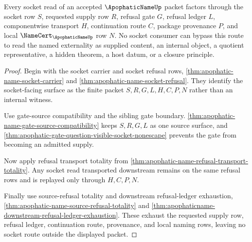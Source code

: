 \begin{theorem}
\label{thm:apophatic-name-socket-gate-route-exhaustion}
Every socket read of an accepted $\ApophaticNameUp$ packet factors through the socket row $S$, requested supply row $R$, refusal gate $G$, refusal ledger $L$, componentwise transport $H$, continuation route $C$, package provenance $P$, and local $\NameCert_{\ApophaticNameUp}$ row $N$. No socket consumer can bypass this route to read the named externality as supplied content, an internal object, a quotient representative, a hidden theorem, a host datum, or a closure principle.
\end{theorem}
\begin{proof}
Begin with the socket carrier and socket refusal rows, \autoref{thm:apophatic-name-socket-carrier} and \autoref{thm:apophatic-name-socket-refusal}. They identify the socket-facing surface as the finite packet $S,R,G,L,H,C,P,N$ rather than an internal witness.

Use gate-source compatibility and the sibling gate boundary. \autoref{thm:apophatic-name-gate-source-compatibility} keeps $S,R,G,L$ as one source surface, and \autoref{thm:apophatic-gate-question-visible-socket-nonescape} prevents the gate from becoming an admitted supply.

Now apply refusal transport totality from \autoref{thm:apophatic-name-refusal-transport-totality}. Any socket read transported downstream remains on the same refusal rows and is replayed only through $H,C,P,N$.

Finally use source-refusal totality and downstream refusal-ledger exhaustion, \autoref{thm:apophatic-name-source-refusal-totality} and \autoref{thm:apophaticname-downstream-refusal-ledger-exhaustion}. These exhaust the requested supply row, refusal ledger, continuation route, provenance, and local naming rows, leaving no socket route outside the displayed packet.
\end{proof}

